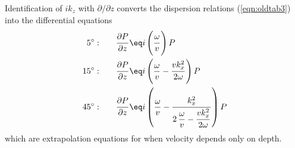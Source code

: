 \par
Identification of  $i k_z$  with  $ \partial / \partial z $  converts
the dispersion relations (\ref{eqn:oldtab3})
into the differential equations
\begin{eqnarray}
 \label{eqn:oldtab4}
 5^\circ : \quad\quad& \displaystyle {\strut \partial P\over \partial z}
                \eq  i\left(
                \displaystyle {\strut\omega\over v} \right) P \\
15^\circ : \quad\quad& \displaystyle {\strut \partial P\over \partial z}
                \eq    i \left(
                    \displaystyle {\omega\over v} - 
                    {\strut v k_x^2\over 2\omega} \right) P
                    \nonumber \\
45^\circ : \quad\quad& \displaystyle {\strut\partial P\over \partial z}
                \eq  i \left(
                      \displaystyle {\omega\over v} -
                      {\strut k_x^2\over
                      \displaystyle {2\,{\omega\over v}   - 
                      {\strut v k_x^2\over 2\omega}}} \right) P
                    \nonumber
\end{eqnarray}
which are extrapolation equations for when velocity depends only on depth.





